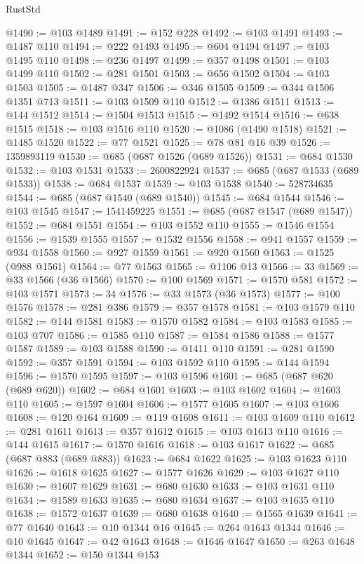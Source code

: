 \begin{lexlean}{RustStd}
\begin{coremodule}
@1490 := @103 @1489
@1491 := @152 @228
@1492 := @103 @1491
@1493 := @1487 @110
@1494 := @222 @1493
@1495 := @604 @1494
@1497 := @103 @1495 @110
@1498 := @236 @1497
@1499 := @357 @1498
@1501 := @103 @1499 @110
@1502 := @281 @1501
@1503 := @656 @1502
@1504 := @103 @1503
@1505 := @1487 @347
@1506 := @346 @1505
@1509 := @344 @1506 @1351 @713
@1511 := @103 @1509 @110
@1512 := @1386 @1511
@1513 := @144 @1512
@1514 := @1504 @1513
@1515 := @1492 @1514
@1516 := @638 @1515
@1518 := @103 @1516 @110
@1520 := @1086 (@1490 @1518)
@1521 := @1485 @1520
@1522 := @77 @1521
@1525 := @78 @81 @16 @39
@1526 := 1359893119
@1530 := @685 (@687 @1526 (@689 @1526))
@1531 := @684 @1530
@1532 := @103 @1531
@1533 := 2600822924
@1537 := @685 (@687 @1533 (@689 @1533))
@1538 := @684 @1537
@1539 := @103 @1538
@1540 := 528734635
@1544 := @685 (@687 @1540 (@689 @1540))
@1545 := @684 @1544
@1546 := @103 @1545
@1547 := 1541459225
@1551 := @685 (@687 @1547 (@689 @1547))
@1552 := @684 @1551
@1554 := @103 @1552 @110
@1555 := @1546 @1554
@1556 := @1539 @1555
@1557 := @1532 @1556
@1558 := @941 @1557
@1559 := @934 @1558
@1560 := @927 @1559
@1561 := @920 @1560
@1563 := @1525 (@988 @1561)
@1564 := @77 @1563
@1565 := @1106 @13
@1566 := 33
@1569 := @33 @1566 (@36 @1566)
@1570 := @100 @1569
@1571 := @1570 @581
@1572 := @103 @1571
@1573 := 34
@1576 := @33 @1573 (@36 @1573)
@1577 := @100 @1576
@1578 := @281 @386
@1579 := @357 @1578
@1581 := @103 @1579 @110
@1582 := @144 @1581
@1583 := @1570 @1582
@1584 := @103 @1583
@1585 := @103 @707
@1586 := @1585 @110
@1587 := @1584 @1586
@1588 := @1577 @1587
@1589 := @103 @1588
@1590 := @1411 @110
@1591 := @281 @1590
@1592 := @357 @1591
@1594 := @103 @1592 @110
@1595 := @144 @1594
@1596 := @1570 @1595
@1597 := @103 @1596
@1601 := @685 (@687 @620 (@689 @620))
@1602 := @684 @1601
@1603 := @103 @1602
@1604 := @1603 @110
@1605 := @1597 @1604
@1606 := @1577 @1605
@1607 := @103 @1606
@1608 := @120 @164
@1609 := @119 @1608
@1611 := @103 @1609 @110
@1612 := @281 @1611
@1613 := @357 @1612
@1615 := @103 @1613 @110
@1616 := @144 @1615
@1617 := @1570 @1616
@1618 := @103 @1617
@1622 := @685 (@687 @883 (@689 @883))
@1623 := @684 @1622
@1625 := @103 @1623 @110
@1626 := @1618 @1625
@1627 := @1577 @1626
@1629 := @103 @1627 @110
@1630 := @1607 @1629
@1631 := @680 @1630
@1633 := @103 @1631 @110
@1634 := @1589 @1633
@1635 := @680 @1634
@1637 := @103 @1635 @110
@1638 := @1572 @1637
@1639 := @680 @1638
@1640 := @1565 @1639
@1641 := @77 @1640
@1643 := @10 @1344 @16
@1645 := @264 @1643 @1344
@1646 := @10 @1645
@1647 := @42 @1643
@1648 := @1646 @1647
@1650 := @263 @1648 @1344
@1652 := @150 @1344 @153

\end{coremodule}
\end{lexlean}
